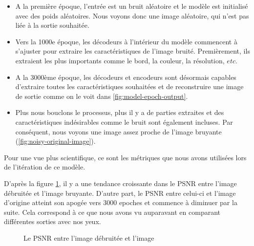 \documentclass[
  11pt,
  dvipsnames]{article}
\providecommand{\tightlist}{%
  \setlength{\itemsep}{0pt}\setlength{\parskip}{0pt}}
\begin{document}
\begin{itemize}
\tightlist
\item
  A la première époque, l'entrée est un bruit aléatoire et le modèle est initialisé avec des poids aléatoires. Nous voyons donc une image aléatoire, qui n'est pas liée à la sortie souhaitée.
\item
  Vers la 1000e époque, les décodeurs à l'intérieur du modèle commencent à s'ajuster pour extraire les caractéristiques de l'image bruité. Premièrement, ils extraient les plus importants comme le bord, la couleur, la résolution, \(etc.\)
\item
  A la 3000ème époque, les décodeurs et encodeurs sont désormais capables d'extraire toutes les caractéristiques souhaitées et de reconstruire une image de sortie comme on le voit dans \ref{fig:model-epoch-output}.
\item
  Plus nous bouclons le processus, plus il y a de parties extraites et des caractéristiques indésirables comme le bruit sont également incluses. Par conséquent, nous voyons une image assez proche de l'image bruyante (\ref{fig:noisy-original-image}).
\end{itemize}

Pour une vue plus scientifique, ce sont les métriques que nous avons utilisées lors de l'itération de ce modèle.

D'après la figure \ref{fig:model-psnr}, il y a une tendance croissante dans le PSNR entre l'image débruitée et l'image bruyante. D'autre part, le PSNR entre celui-ci et l'image d'origine atteint son apogée vers 3000 epoches et commence à diminuer par la suite. Cela correspond à ce que nous avons vu auparavant en comparant différentes sorties avec nos yeux.

\begin{figure}

{\centering {}

}

\caption{Le PSNR entre l'image débruitée et l'image}\label{fig:model-psnr}
\end{figure}
\end{document}
